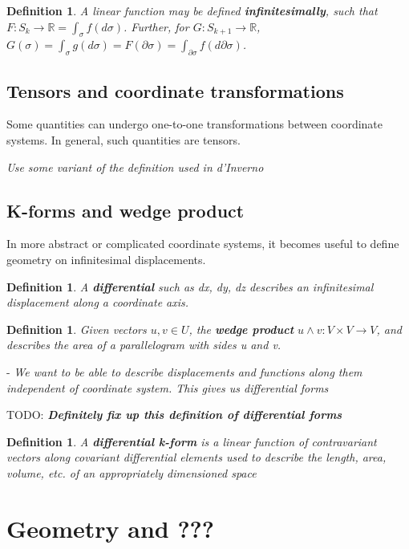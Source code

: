 \documentclass{book}
\newtheorem{defn}[equation]{Definition}
\begin{document}
\begin{defn}
	A linear function may be defined \textbf{infinitesimally}, such that $F : S_k \to \mathbb{R} = \int_{\sigma} f(d\sigma)$. Further, for $G : S_{k+1} \to \mathbb{R}$, $G(\sigma) = \int_{\sigma} g(d\sigma) = F(\partial\sigma) = \int_{\partial\sigma}f(d\partial\sigma)$. 
\end{defn}


\section{Tensors and coordinate transformations}
Some quantities can undergo one-to-one transformations between coordinate systems. In general, such quantities are tensors. 

\emph{Use some variant of the definition used in d'Inverno}

\section{K-forms and wedge product}
In more abstract or complicated coordinate systems, it becomes useful to define geometry on infinitesimal displacements. 

\begin{defn}
	A \textbf{differential} such as dx, dy, dz describes an infinitesimal displacement along a coordinate axis. 
\end{defn}

\begin{defn}
	Given vectors $u, v \in U$, the \textbf{wedge product} $u \wedge v: V \times V \to V$, and describes the area of a parallelogram with sides u and v. 
\end{defn}

- \emph{We want to be able to describe displacements and functions along them independent of coordinate system. This gives us differential forms}

TODO: \emph{\textbf{Definitely fix up this definition of differential forms}}

\begin{defn}
	A \textbf{differential k-form} is a linear function of contravariant vectors along covariant differential elements used to describe the length, area, volume, etc. of an appropriately dimensioned space 
\end{defn}


\chapter{Geometry and ???}
\end{document}
